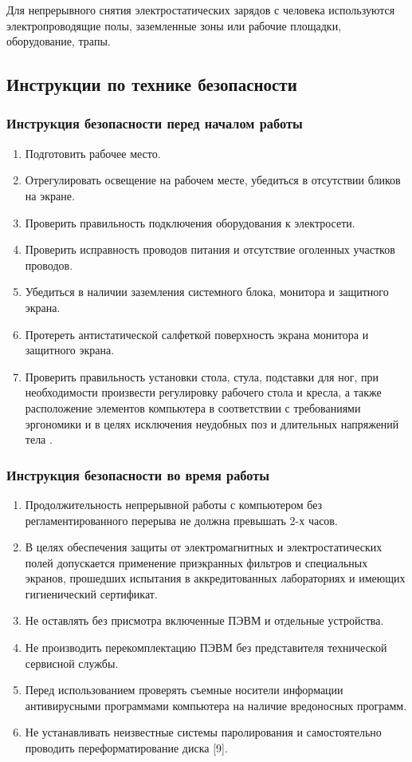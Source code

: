 Для непрерывного снятия электростатических зарядов с человека используются электропроводящие полы, заземленные зоны или рабочие площадки, оборудование, трапы.

\subsection{Инструкции по технике безопасности}

\subsubsection{Инструкция безопасности перед началом работы}

\begin{enumerate}
 \item Подготовить рабочее место.
 \item Отрегулировать освещение на рабочем месте, убедиться в отсутствии бликов на экране.
 \item Проверить правильность подключения оборудования к электросети.
 \item Проверить исправность проводов питания и отсутствие оголенных участков проводов.
 \item Убедиться в наличии заземления системного блока, монитора и защитного экрана.
 \item Протереть антистатической салфеткой поверхность экрана монитора и защитного экрана.
 \item Проверить правильность установки стола, стула, подставки для ног, при необходимости произвести регулировку рабочего стола и кресла, а также расположение элементов компьютера в соответствии с требованиями эргономики и в целях исключения неудобных поз и длительных напряжений тела \cite{OT3}.
\end{enumerate}

\subsubsection{Инструкция безопасности во время работы}

\begin{enumerate}
 \item Продолжительность непрерывной работы с компьютером без регламентированного перерыва не должна превышать 2-х часов.
 \item В целях обеспечения защиты от электромагнитных и электростатических полей допускается применение приэкранных фильтров и специальных экранов, прошедших испытания в аккредитованных лабораториях и имеющих гигиенический сертификат.
 \item Не оставлять без присмотра включенные ПЭВМ и отдельные устройства.
 \item Не производить перекомплектацию ПЭВМ без представителя технической сервисной службы.
 \item Перед использованием проверять съемные носители информации антивирусными программами компьютера на наличие вредоносных программ.
 \item Не устанавливать неизвестные системы паролирования и самостоятельно проводить переформатирование диска [9].
\end{enumerate}

